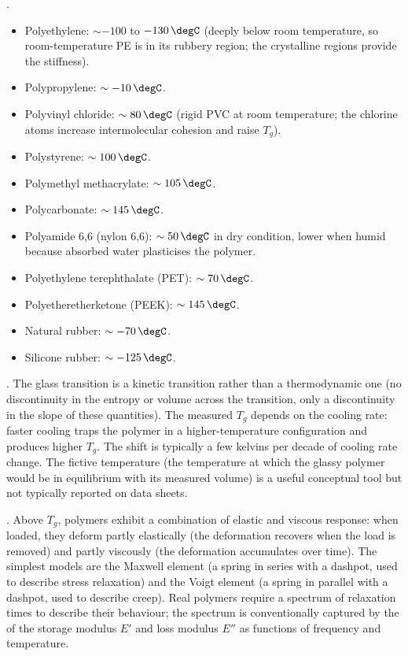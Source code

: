 .

\begin{itemize}[leftmargin=*]
\item Polyethylene: $\sim -100$ to $-130\,\degC$ (deeply below room
  temperature, so room-temperature PE is in its rubbery region; the
  crystalline regions provide the stiffness).
\item Polypropylene: $\sim -10\,\degC$.
\item Polyvinyl chloride: $\sim 80\,\degC$ (rigid PVC at room
  temperature; the chlorine atoms increase intermolecular cohesion
  and raise $T_g$).
\item Polystyrene: $\sim 100\,\degC$.
\item Polymethyl methacrylate: $\sim 105\,\degC$.
\item Polycarbonate: $\sim 145\,\degC$.
\item Polyamide 6,6 (nylon 6,6): $\sim 50\,\degC$ in dry condition,
  lower when humid because absorbed water plasticises the polymer.
\item Polyethylene terephthalate (PET): $\sim 70\,\degC$.
\item Polyetheretherketone (PEEK): $\sim 145\,\degC$.
\item Natural rubber: $\sim -70\,\degC$.
\item Silicone rubber: $\sim -125\,\degC$.
\end{itemize}

. The glass transition is a
kinetic transition rather than a thermodynamic one (no discontinuity
in the entropy or volume across the transition, only a discontinuity
in the slope of these quantities). The measured $T_g$ depends on the
cooling rate: faster cooling traps the polymer in a higher-temperature
configuration and produces higher $T_g$. The shift is typically a
few kelvins per decade of cooling rate change. The fictive temperature
(the temperature at which the glassy polymer would be in equilibrium
with its measured volume) is a useful conceptual tool but not
typically reported on data sheets.

. Above $T_g$, polymers exhibit a combination
of elastic and viscous response: when loaded, they deform partly
elastically (the deformation recovers when the load is removed) and
partly viscously (the deformation accumulates over time). The
simplest models are the Maxwell element (a spring in series with a
dashpot, used to describe stress relaxation) and the Voigt element
(a spring in parallel with a dashpot, used to describe creep). Real
polymers require a spectrum of relaxation times to describe their
behaviour; the spectrum is conventionally captured by the
 of the storage modulus $E'$ and
loss modulus $E''$ as functions of frequency and temperature.

